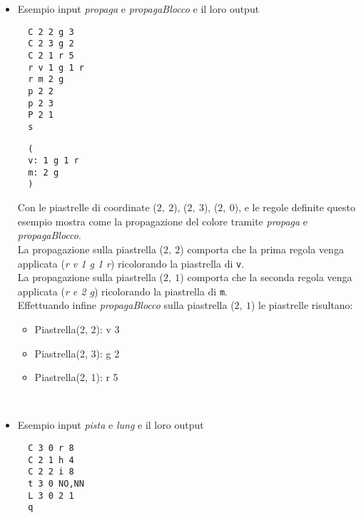 \documentclass{article}
\begin{document}
\begin{itemize}
  \item  Esempio input \textit{propaga} e \textit{propagaBlocco} e il loro output\\
  \begin{minipage}[t]{0.45\textwidth}
  \begin{verbatim}
  C 2 2 g 3
  C 2 3 g 2
  C 2 1 r 5
  r v 1 g 1 r
  r m 2 g
  p 2 2
  p 2 3
  P 2 1
  s
  \end{verbatim}
  \end{minipage}
  \hfill
  \begin{minipage}[t]{0.45\textwidth}
  \begin{itemize}
  \begin{verbatim}
  (
  v: 1 g 1 r
  m: 2 g
  )
  \end{verbatim}
  \end{itemize}
  \end{minipage}
  Con le piastrelle di coordinate (\(2,\ 2\)), (\(2,\ 3\)), (\(2,\ 0\)), e le regole definite questo esempio mostra come la propagazione del colore tramite \textit{propaga} e \textit{propagaBlocco}.\\ 
  La propagazione sulla piastrella (\(2,\ 2\)) comporta che la prima regola venga applicata (\textit{r v 1 g 1 r}) ricolorando la piastrella di \texttt{v}.\\
  La propagazione sulla piastrella (\(2,\ 1\)) comporta che la seconda regola venga applicata (\textit{r e 2 g}) ricolorando la piastrella di \texttt{m}.\\
  Effettuando infine \textit{propagaBlocco} sulla piastrella (\(2,\ 1\)) le piastrelle risultano:\\
  \begin{itemize}
    \item Piastrella(2, 2): v 3
    \item Piastrella(2, 3): g 2
    \item Piastrella(2, 1): r 5
  \end{itemize}
  \\
  \item  Esempio input \textit{pista} e \textit{lung} e il loro output\\
  \begin{minipage}[t]{0.45\textwidth}
  \begin{verbatim}
  C 3 0 r 8
  C 2 1 h 4
  C 2 2 i 8
  t 3 0 NO,NN
  L 3 0 2 1
  q
  \end{verbatim}
  \end{minipage}
  \hfill
  \begin{minipage}[t]{0.45\textwidth}

\end{minipage}
\end{itemize}
\end{document}
